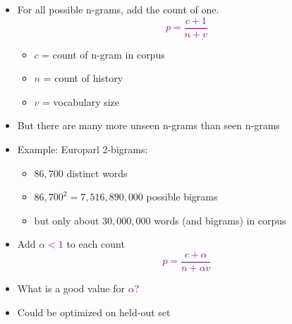 \documentclass[landscape]{slides}
\newcommand{\maths}[1]{\textcolor{purple}{#1}}
\begin{document}

\begin{itemize}
\item For all possible n-grams, add the count of one.
\maths{\begin{equation*}
p=\frac{c+1}{n+v}
\end{equation*}}
\vspace{-12mm}
\begin{itemize}
\item \maths{$c$} = count of n-gram in corpus
\item \maths{$n$} = count of history
\item \maths{$v$} = vocabulary size
\end{itemize}
\item But there are many more unseen n-grams than seen n-grams
\item Example: Europarl 2-bigrams:
\begin{itemize}
\item $86,700$ distinct words
\item  $86,700^2 = 7,516,890,000$ possible bigrams
\item but only about $30,000,000$ words (and bigrams) in corpus
\end{itemize}
\end{itemize}


\vspace{30mm}
\begin{itemize}
\item Add \maths{$\alpha<1$} to each count
\maths{\begin{equation*}
p=\frac{c+\alpha}{n+\alpha v}
\end{equation*}}
\item What is a good value for  \maths{$\alpha$}?
\item Could be optimized on held-out set
\end{itemize}

\end{document}
